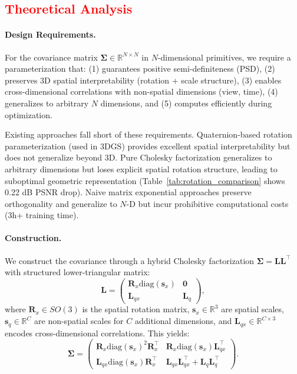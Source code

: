 \documentclass{article} %
\begin{document}
\subsection{\textcolor{red}{Theoretical Analysis}}

\paragraph{Design Requirements.}
For the covariance matrix $\bm{\Sigma} \in \mathbb{R}^{N \times N}$ in $N$-dimensional primitives, we require a parameterization that: (1) guarantees positive semi-definiteness (PSD), (2) preserves 3D spatial interpretability (rotation + scale structure), (3) enables cross-dimensional correlations with non-spatial dimensions (view, time), (4) generalizes to arbitrary $N$ dimensions, and (5) computes efficiently during optimization.

Existing approaches fall short of these requirements. Quaternion-based rotation parameterization (used in 3DGS) provides excellent spatial interpretability but does not generalize beyond 3D. Pure Cholesky factorization generalizes to arbitrary dimensions but loses explicit spatial rotation structure, leading to suboptimal geometric representation (Table~\ref{tab:rotation_comparison} shows 0.22 dB PSNR drop). Naive matrix exponential approaches preserve orthogonality and generalize to $N$-D but incur prohibitive computational costs (3h+ training time).

\paragraph{Construction.}
We construct the covariance through a hybrid Cholesky factorization $\bm{\Sigma} = \bm{L}\bm{L}^\top$ with structured lower-triangular matrix:
\begin{equation}
\bm{L} = \begin{pmatrix} \bm{R}_x \text{diag}(\bm{s}_x) & \bm{0} \\ \bm{L}_{qx} & \bm{L}_{q} \end{pmatrix},
\end{equation}
where $\bm{R}_x \in SO(3)$ is the spatial rotation matrix, $\bm{s}_x \in \mathbb{R}^3$ are spatial scales, $\bm{s}_q \in \mathbb{R}^C$ are non-spatial scales for $C$ additional dimensions, and $\bm{L}_{qx} \in \mathbb{R}^{C \times 3}$ encodes cross-dimensional correlations. This yields:
\begin{equation}
\bm{\Sigma} = \begin{pmatrix} \bm{R}_x \text{diag}(\bm{s}_x)^2 \bm{R}_x^\top & \bm{R}_x \text{diag}(\bm{s}_x) \bm{L}_{qx}^\top \\ \bm{L}_{qx} \text{diag}(\bm{s}_x) \bm{R}_x^\top & \bm{L}_{qx} \bm{L}_{qx}^\top + \bm{L}_{q}\bm{L}_{q}^\top \end{pmatrix}.
\end{equation}
\end{document}
